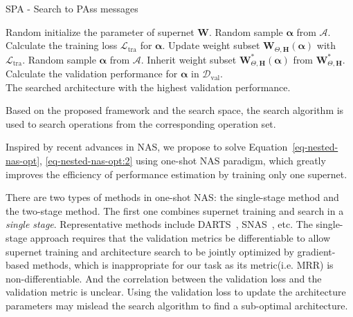 \documentclass[11pt]{article}
\def\bal{\bm{\alpha}}
\begin{document}
\begin{algorithm}[tb]
	\caption{SPA - Search to PAss messages}
	\begin{algorithmic}[1]
		\State Random initialize the parameter of supernet $\mathbf{W}$.
		\State Random sample $\bal$ from $\mathcal{A}$.
		\State Calculate the training loss $\mathcal{L}_{\text{tra}}$ for $\bal$.
		\State Update weight subset $\mathbf{W}_{\Theta,\mathbf{H}}(\bal)$ with $\mathcal{L}_{\text{tra}}$.
		\EndFor
		\EndWhile
		\State Random sample $\bal$ from $\mathcal{A}$.
		\State Inherit weight subset $\mathbf{W}_{\Theta,\mathbf{H}}^*(\bal)$ from $\mathbf{W}_{\Theta,\mathbf{H}}^*$.
		\State Calculate the validation performance for $\bal$ in $\mathcal{D}_{\text{val}}$.
		\EndWhile \\
		\Return The searched architecture with the highest validation performance.
	\end{algorithmic}
	\label{alg-spa}
	\vspace{-2px}
\end{algorithm}

Based on the proposed framework and the search space, 
the search algorithm is used to search operations from the corresponding operation set.

Inspired by recent advances in NAS, 
we propose to solve Equation~\eqref{eq-nested-nas-opt}, \eqref{eq-nested-nas-opt:2} 
using one-shot NAS paradigm, 
which greatly improves the efficiency of performance estimation by training only one supernet.

There are two types of methods in one-shot NAS: 
the single-stage method and the two-stage method.
The first one combines supernet training and search in a \emph{single stage}.
Representative methods include DARTS~\citep{liu2019darts}, SNAS~\citep{xie2019snas}, etc.
The single-stage approach requires that the validation metrics be differentiable 
to allow supernet training and architecture search to be jointly optimized by gradient-based methods,
which is inappropriate for our task as its metric(i.e. MRR) is non-differentiable. 
And the correlation between the validation loss and the validation metric is unclear.
Using the validation loss to update the architecture parameters may mislead the search algorithm to find a sub-optimal architecture.
\end{document}
